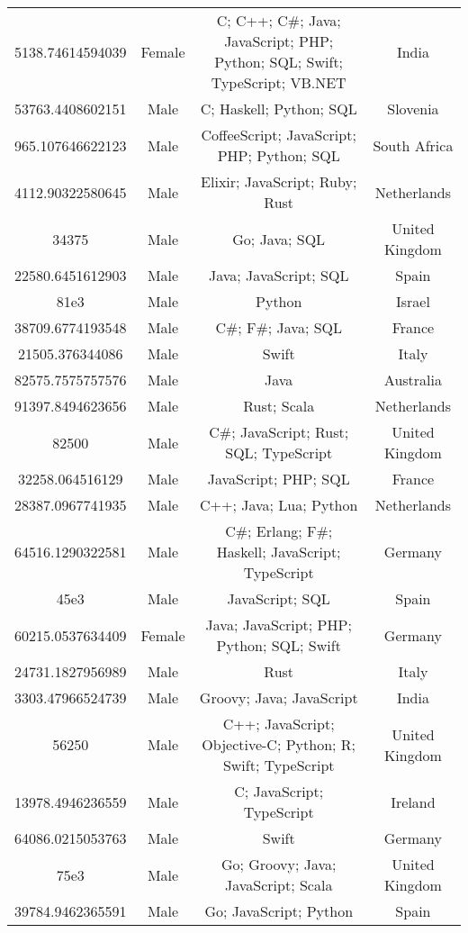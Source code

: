 \begin{center}
\begin{tabular}{ |c|c|c|c| }
5138.74614594039  &  Female  &  C; C++; C\#; Java; JavaScript; PHP; Python; SQL; Swift; TypeScript; VB.NET  &  India  \\ 
53763.4408602151  &  Male  &  C; Haskell; Python; SQL  &  Slovenia  \\ 
965.107646622123  &  Male  &  CoffeeScript; JavaScript; PHP; Python; SQL  &  South Africa  \\ 
4112.90322580645  &  Male  &  Elixir; JavaScript; Ruby; Rust  &  Netherlands  \\ 
34375  &  Male  &  Go; Java; SQL  &  United Kingdom  \\ 
22580.6451612903  &  Male  &  Java; JavaScript; SQL  &  Spain  \\ 
81e3  &  Male  &  Python  &  Israel  \\ 
38709.6774193548  &  Male  &  C\#; F\#; Java; SQL  &  France  \\ 
21505.376344086  &  Male  &  Swift  &  Italy  \\ 
82575.7575757576  &  Male  &  Java  &  Australia  \\ 
91397.8494623656  &  Male  &  Rust; Scala  &  Netherlands  \\ 
82500  &  Male  &  C\#; JavaScript; Rust; SQL; TypeScript  &  United Kingdom  \\ 
32258.064516129  &  Male  &  JavaScript; PHP; SQL  &  France  \\ 
28387.0967741935  &  Male  &  C++; Java; Lua; Python  &  Netherlands  \\ 
64516.1290322581  &  Male  &  C\#; Erlang; F\#; Haskell; JavaScript; TypeScript  &  Germany  \\ 
45e3  &  Male  &  JavaScript; SQL  &  Spain  \\ 
60215.0537634409  &  Female  &  Java; JavaScript; PHP; Python; SQL; Swift  &  Germany  \\ 
24731.1827956989  &  Male  &  Rust  &  Italy  \\ 
3303.47966524739  &  Male  &  Groovy; Java; JavaScript  &  India  \\ 
56250  &  Male  &  C++; JavaScript; Objective-C; Python; R; Swift; TypeScript  &  United Kingdom  \\ 
13978.4946236559  &  Male  &  C; JavaScript; TypeScript  &  Ireland  \\ 
64086.0215053763  &  Male  &  Swift  &  Germany  \\ 
75e3  &  Male  &  Go; Groovy; Java; JavaScript; Scala  &  United Kingdom  \\ 
39784.9462365591  &  Male  &  Go; JavaScript; Python  &  Spain  \\ 

\end{tabular}
\end{center}
